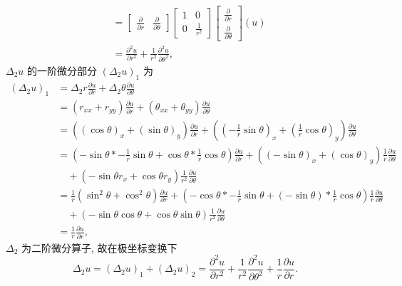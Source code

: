 \documentclass[../main.tex]{subfiles}
\begin{document}
\begin{align*}
    &=
    \begin{bmatrix}
        \frac{\partial}{\partial r} & \frac{\partial}{\partial \theta}
    \end{bmatrix}
    \begin{bmatrix}
        1 & 0 \\
        0 & \frac{1}{r^2}
    \end{bmatrix}
    \begin{bmatrix}
        \frac{\partial}{\partial r} \\
        \frac{\partial}{\partial \theta}
    \end{bmatrix}
    \left( u \right) \\
    &= \frac{\partial^2 u}{\partial r^2} + \frac{1}{r^2} \frac{\partial^2 u}{\partial \theta^2}
    ,
\end{align*}
$\Delta_2 u$ 的一阶微分部分 $\left( \Delta_2 u \right)_1$ 为
\begin{align*}
    \left( \Delta_2 u \right)_1
    &= \Delta_2 r \frac{\partial u}{\partial r} + \Delta_2 \theta \frac{\partial u}{\partial \theta} \\
    &= \left( r_{xx} + r_{yy} \right) \frac{\partial u}{\partial r} + \left( \theta_{xx} + \theta_{yy} \right) \frac{\partial u}{\partial \theta} \\
    &= \left(
        \left( \cos \theta \right)_x + \left( \sin \theta \right)_y
    \right) \frac{\partial u}{\partial r}
    + \left(
        \left( - \frac{1}{r} \sin \theta \right)_x + \left( \frac{1}{r} \cos \theta \right)_y
    \right) \frac{\partial u}{\partial \theta} \\
    &= \left( 
        - \sin \theta * - \frac{1}{r} \sin \theta + \cos \theta * \frac{1}{r} \cos \theta
    \right) \frac{\partial u}{\partial r} + 
    \left( 
            \left( - \sin \theta \right)_x + \left( \cos \theta \right)_y
    \right) \frac{1}{r} \frac{\partial u}{\partial \theta} \\
    &\quad + \left( 
            - \sin \theta r_x + \cos \theta r_y
    \right) \frac{1}{r^2} \frac{\partial u}{\partial \theta} \\
    &=
    \frac{1}{r} \left( \sin^2 \theta + \cos^2 \theta \right) \frac{\partial u}{\partial r}  +
    \left( 
            - \cos \theta * - \frac{1}{r} \sin \theta + \left( - \sin \theta \right)  * \frac{1}{r} \cos \theta
    \right) \frac{1}{r} \frac{\partial u}{\partial \theta} \\
    &\quad + \left( 
            - \sin \theta \cos \theta + \cos \theta \sin \theta
    \right) \frac{1}{r^2} \frac{\partial u}{\partial \theta} \\
    &= \frac{1}{r} \frac{\partial u}{\partial r}
    ,
\end{align*}
$\Delta_2$ 为二阶微分算子, 故在极坐标变换下
\[
    \Delta_2 u
    = \left( \Delta_2 u \right)_1 + \left( \Delta_2 u \right)_2
    = \frac{\partial^2 u}{\partial r^2} + \frac{1}{r^2} \frac{\partial^2 u}{\partial \theta^2} + \frac{1}{r} \frac{\partial u}{\partial r}.
\]
\end{document}
